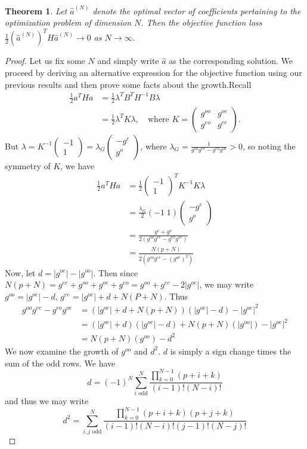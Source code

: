 \documentclass{article}
\newtheorem{thm}{Theorem}[section]
\theoremstyle{definition}
\theoremstyle{remark}
\numberwithin{equation}{section}
\begin{document}
\begin{thm}
Let $\hat{a}^{(N)}$ denote the optimal vector of coefficients pertaining to the optimization problem of dimension $N$. Then the objective function loss $\frac{1}{2}(\hat{a}^{(N)})^T H \hat{a}^{(N)} \to 0$ as $N\to \infty$.
\end{thm}
\begin{proof}
Let us fix some $N$ and simply write $\hat{a}$ as the corresponding solution. We proceed by deriving an alternative expression for the objective function using our previous results and then prove some facts about the growth.Recall
\begin{align*}
\frac{1}{2}a^T Ha &=\frac{1}{2} \lambda^T B^T H^{-1}B \lambda \\
&= \frac{1}{2} \lambda^T K\lambda, \quad \text{where } K= \begin{pmatrix} g^{oo} & g^{oe} \\
g^{eo} & g^{ee} \end{pmatrix}.
\end{align*} But $\lambda = K^{-1} \begin{pmatrix} -1 \\ 1 \end{pmatrix} = \lambda_G \begin{pmatrix} -g^e \\ g^o \end{pmatrix}$, where $\lambda_G = \frac{1}{g^{oo} g^{ee} - g^{eo}g^{oe}} >0$, so noting the symmetry of $K$, we have 
\begin{align*}
\frac{1}{2} a^T Ha &= \frac{1}{2}\begin{pmatrix} -1 \\ 1\end{pmatrix} ^T K^{-1} K \lambda \\ 
&= \frac{\lambda_G}{2}(-1 \; 1) \begin{pmatrix} -g^e \\ g^o \end{pmatrix}\\
&= \frac{g^e + g^o}{2(g^{oo} g^{ee} - g^{eo}g^{oe})}\\
&= \frac{N(p+N)}{2(g^{oo}g^{ee} - (g^{oe})^2)}
\end{align*}
Now, let $d=|g^{oe}| - |g^{oo}|$. Then since $N(p+N) = g^{ee} + g^{oo} + g^{oe} + g^{eo} = g^{oo}+g^{ee} - 2|g^{oe}|$, we may write $g^{oo} = |g^{oe}|-d$, $g^{ee} = |g^{oe}| + d + N(P+N)$. Thus 
\begin{align*}
g^{oo} g^{ee} - g^{eo}g^{oe} &=  (|g^{oe}| + d + N(p+N)) (|g^{oe}| - d) - |g^{oe}|^2 \\
&= (|g^{oe}|+d)(|g^{oe}| - d) + N(p+N)(|g^{oo}|) - |g^{oe}|^2\\
&= N(p+N)(g^{oo}) - d^2
\end{align*}
We now examine the growth of $g^{oo}$ and $d^2$. $d$ is simply a sign change times the sum of the odd rows. We have
\[d = (-1)^N \sum_{i \text{ odd}}^N \frac{\prod_{k=0}^{N-1} (p+i+k)}{(i-1)!(N-i)!} \] 
and thus we may write 
\[d^2 = \sum_{i,j \text{ odd}}^N 
\frac{\prod_{k=0}^{N-1} (p+i+k)(p+j+k)}{(i-1)! (N-i)! (j-1)! (N-j)!} \]


\end{proof}
\end{document}

